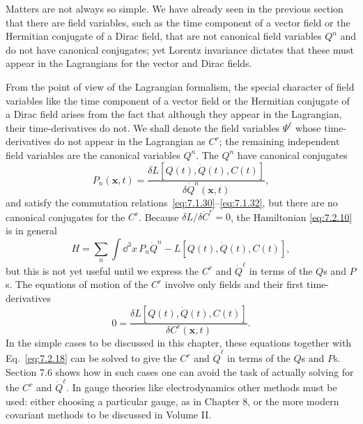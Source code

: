 Matters are not always so simple. We have already seen in the previous
section that there are field variables, such as the time component of a
vector field or the Hermitian conjugate of a Dirac field, that are not
canonical field variables $Q^n$ and do not have canonical conjugates; yet
Lorentz invariance dictates that these must appear in the Lagrangians for
the vector and Dirac fields.

From the point of view of the Lagrangian formalism, the special character
of field variables like the time component of a vector field or the
Hermitian conjugate of a Dirac field arises from the fact that although
they appear in the Lagrangian, their time-derivatives do not. We shall
denote the field variables $\Psi^\ell$ whose time-derivatives do not appear in
the Lagrangian as $C^r$; the remaining independent field variables are the
canonical variables $Q^n$. The $Q^n$ have canonical conjugates
\begin{equation}
P_n(\mathbf{x},t)=
\frac{\delta L[Q(t),\dot Q(t),C(t)]}{\delta\dot Q^n(\mathbf{x},t)},
\tag{7.2.18}\label{eq:7.2.18}
\end{equation}
and satisfy the commutation relations~\eqref{eq:7.1.30}--\eqref{eq:7.1.32}, but there are no
canonical conjugates for the $C^r$. Because $\delta L/\delta\dot C^r=0$, the
Hamiltonian \eqref{eq:7.2.10} is in general
\begin{equation}
H=\sum_n\int \dd^3x\,P_n\dot Q^n-L[Q(t),\dot Q(t),C(t)],
\tag{7.2.19}\label{eq:7.2.19}
\end{equation}
but this is not yet useful until we express the $C^r$ and $\dot Q^\ell$ in terms of the
$Q$s and $P$s. The equations of motion of the $C^r$ involve only fields and
their first time-derivatives
\begin{equation}
0=\frac{\delta L[Q(t),\dot Q(t),C(t)]}{\delta C^r(\mathbf{x},t)}.
\tag{7.2.20}\label{eq:7.2.20}
\end{equation}
In the simple cases to be discussed in this chapter, these equations together
with Eq.~\eqref{eq:7.2.18} can be solved to give the $C^r$ and $\dot Q^\ell$ in terms of the
$Q$s and $P$s. Section 7.6 shows how in such cases one can avoid the task of
actually solving for the $C^r$ and $\dot Q^\ell$. In gauge theories like electrodynamics
other methods must be used: either choosing a particular gauge, as in
Chapter 8, or the more modern covariant methods to be discussed in
Volume II.


